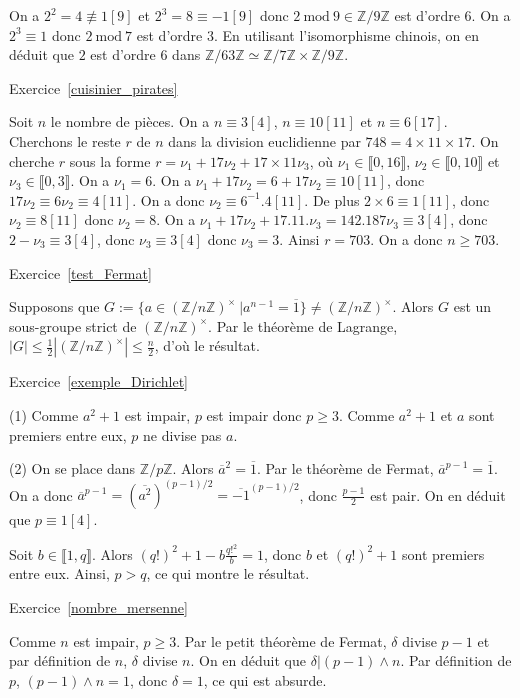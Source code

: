 \documentclass[11pt,a4paper]{article}
\newcommand{\Z}{\mathbb{Z}}
\begin{document}
On a $2^2=4\not \equiv 1[9]$ et $2^3=8\equiv -1[9]$ donc $2\mathrm{\ mod\ }9\in \Z/9\Z$ est d'ordre $6$. On a $2^3\equiv 1$ donc $2\mathrm{\ mod\ }7$ est d'ordre $3$. En utilisant l'isomorphisme chinois, on en déduit que $2$ est d'ordre $6$ dans $\Z/63\Z\simeq \Z/7\Z\times \Z/9\Z$. 


Exercice~\ref{cuisinier_pirates}

Soit $n$ le nombre de pièces. On a $n\equiv 3[4]$, $n\equiv 10[11]$ et $n\equiv 6[17]$. Cherchons le reste $r$ de $n$ dans la division euclidienne par $748=4\times 11\times 17$. On cherche $r$ sous la forme $r=\nu_1+17\nu_2+17\times 11 \nu_3$, où $\nu_1\in \llbracket 0,16\rrbracket$, $\nu_2\in \llbracket 0,10\rrbracket$ et $\nu_3\in \llbracket 0,3\rrbracket$. On a $\nu_1=6$. On a $\nu_1+17\nu_2=6+17\nu_2\equiv 10[11]$, donc $17\nu_2\equiv 6\nu_2\equiv 4[11]$. On a donc $ \nu_2\equiv 6^{-1} .4[11]$. De plus $2\times 6\equiv 1[11]$, donc $\nu_2\equiv 8[11]$ donc $\nu_2=8$. On a $\nu_1+17\nu_2+17.11.\nu_3=142.187\nu_3\equiv 3[4]$, donc $2-\nu_3\equiv 3[4]$, donc $\nu_3\equiv 3[4]$ donc $\nu_3=3$. Ainsi $r=703$. On a donc $n\geq 703$. 


Exercice~\ref{test_Fermat}

Supposons que $G:=\{a\in (\Z/n\Z)^\times\ |a^{n-1}=\overline{1}\}\neq (\Z/n\Z)^\times$. Alors $G$ est un sous-groupe strict de $(\Z/n\Z)^\times$. Par le théorème de Lagrange, $|G|\leq \frac{1}{2}|(\Z/n\Z)^\times|\leq \frac{n}{2}$, d'où le résultat.


Exercice~\ref{exemple_Dirichlet}

(1) Comme $a^2+1$ est impair, $p$ est impair donc $p\geq 3$. Comme $a^2+1$ et $a$ sont premiers entre eux, $p$ ne divise pas $a$.

(2) On se place dans $\Z/p\Z$. Alors $\overline{a}^2=\overline{1}$. Par le théorème de Fermat, $\overline{a}^{p-1}=\overline{1}$. On a donc $\overline{a}^{p-1}=(\overline{a^2})^{(p-1)/2}=\overline{-1}^{(p-1)/2}$, donc $\frac{p-1}{2}$ est pair. On en déduit que $p\equiv 1[4]$.

Soit $b\in \llbracket 1,q\rrbracket$. Alors $(q!)^2+1-b \frac{q!^2}{b}=1$, donc $b$ et $(q!)^2+1$ sont premiers entre eux. Ainsi, $p>q$, ce qui montre le résultat.

Exercice~\ref{nombre_mersenne}

Comme $n$ est impair, $p\geq 3$. Par le petit théorème de Fermat, $\delta$ divise $p-1$ et par définition de $n$, $\delta$ divise $n$. On en déduit que $\delta| (p-1)\wedge n$. Par définition de $p$, $(p-1)\wedge n=1$, donc $\delta=1$, ce qui est absurde.
\end{document}
